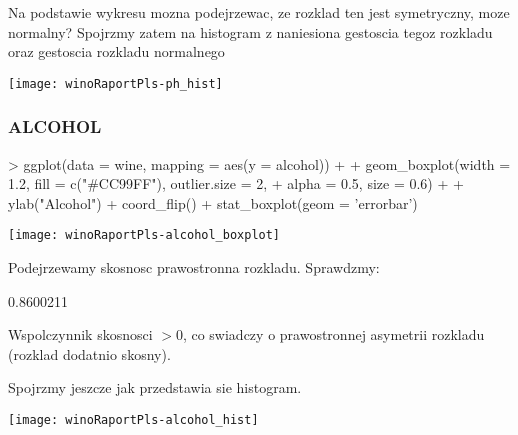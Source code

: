 \documentclass{article}
\begin{document}
Na podstawie wykresu mozna podejrzewac, ze rozklad ten jest symetryczny, moze normalny?
\newline
Spojrzmy zatem na histogram z naniesiona gestoscia tegoz rozkladu oraz gestoscia rozkladu normalnego

\begin{Schunk}
\end{Schunk}
\texttt{[image: winoRaportPls-ph\_hist]}



\subsubsection{ALCOHOL}

\begin{Schunk}
\begin{Sinput}
> ggplot(data = wine, mapping = aes(y = alcohol)) + 
+   geom_boxplot(width = 1.2, fill = c("#CC99FF"), outlier.size = 2, 
+                alpha = 0.5, size = 0.6) +
+   ylab("Alcohol") + coord_flip() + stat_boxplot(geom = 'errorbar')
\end{Sinput}
\end{Schunk}
\texttt{[image: winoRaportPls-alcohol\_boxplot]}

Podejrzewamy skosnosc prawostronna rozkladu.
Sprawdzmy:

\begin{Schunk}
\begin{Soutput}
[1] 0.8600211
\end{Soutput}
\end{Schunk}

Wspolczynnik skosnosci $>0$, co swiadczy o prawostronnej asymetrii rozkladu (rozklad dodatnio skosny).

Spojrzmy jeszcze jak przedstawia sie histogram.

\begin{Schunk}
\end{Schunk}
\texttt{[image: winoRaportPls-alcohol\_hist]}
\end{document}
